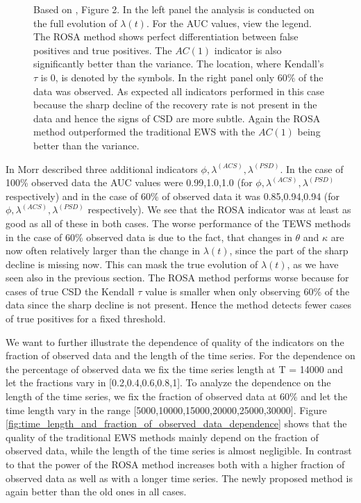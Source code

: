 \documentclass[%
thesis=student,%
coverpage=false,%
titlepage=false,%
headmarks=true, %
english,%
font=libertine, %
math=newpxtx, %
BCOR=5mm,%
coverBCOR=11mm%
]{tumbook}
\begin{document}
\begin{figure}[h!]
    \caption{Based on \cite{Morr:2024}, Figure 2. In the left panel the analysis is conducted on the full evolution of $\lambda(t)$. For the AUC values, view the legend. The ROSA method shows perfect differentiation between false positives and true positives. The $AC(1)$ indicator is also significantly better than the variance. The location, where Kendall's $\tau$ is 0, is denoted by the symbols. In the right panel only 60\% of the data was observed. As expected all indicators performed in this case because the sharp decline of the recovery rate is not present in the data and hence the signs of CSD are more subtle. Again the ROSA method outperformed the traditional EWS with the $AC(1)$ being better than the variance.}
    \label{fig:ROC_curves}
\end{figure}
 

In \cite{Morr:2024} Morr described three additional indicators $\phi,\lambda^{(ACS)},\lambda^{(PSD)}$. In the case of 100\% observed data the AUC values were 0.99,1.0,1.0 (for $\phi,\lambda^{(ACS)},\lambda^{(PSD)}$ respectively) and in the case of 60\% of observed data it was 0.85,0.94,0.94 (for $\phi,\lambda^{(ACS)},\lambda^{(PSD)}$ respectively). We see that the ROSA indicator was at least as good as all of these in both cases.
The worse performance of the TEWS methods in the case of 60\% observed data is due to the fact, that changes in $\theta$ and $\kappa$ are now often relatively larger than the change in $\lambda(t)$, since the part of the sharp decline is missing now. This can mask the true evolution of $\lambda(t)$, as we have seen also in the previous section. The ROSA method performs worse because for cases of true CSD the Kendall $\tau$ value is smaller when only observing 60\% of the data since the sharp decline is not present. Hence the method detects fewer cases of true positives for a fixed threshold.

We want to further illustrate the dependence of quality of the indicators on the fraction of observed data and the length of the time series. For the dependence on the percentage of observed data we fix the time series length at T = 14000 and let the fractions vary in [0.2,0.4,0.6,0.8,1]. To analyze the dependence on the length of the time series, we fix the fraction of observed data at 60\% and let the time length vary in the range [5000,10000,15000,20000,25000,30000]. Figure \ref{fig:time_length_and_fraction_of_observed_data_dependence} shows that the quality of the traditional EWS methods mainly depend on the fraction of observed data, while the length of the time series is almost negligible. In contrast to that the power of the ROSA method increases both with a higher fraction of observed data as well as with a longer time series. The newly proposed method is again better than the old ones in all cases. 
\end{document}
